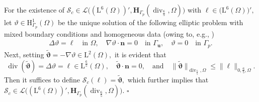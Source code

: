 \documentclass[11pt, reqno, a4paper, twoside]{article}
\newcommand{\bn}{\boldsymbol{n}}
\newcommand{\bu}{\boldsymbol{u}}
\newcommand{\bz}{\boldsymbol{z}}
\newcommand\btau{\boldsymbol{\tau}}
\newcommand{\rH}{\mathrm{H}}
\newcommand{\rL}{\mathrm{L}}
\newcommand{\rW}{\mathrm{W}}
\newcommand{\bH}{\mathbf{H}}
\newcommand{\bL}{\mathbf{L}}
\newcommand{\cL}{\mathcal{L}}
\newcommand{\cS}{\mathcal{S}}
\newcommand\vdiv{\mathop{\mathrm{div}}\nolimits}
\newtheorem{lemma}[theorem]{Lemma}
\newenvironment{proof}{\noindent{\it Proof.}}{\hfill$\square$}
\numberwithin{equation}{section}
\numberwithin{remark}{section}
\numberwithin{figure}{section}
\numberwithin{table}{section}
\newcommand{\rd}[1]{\textcolor{BrickRed}{#1}}
\begin{document}
{\begin{proof}
For the existence of \(\cS_c\in\cL\bigl((\rL^6(\Omega))',\bH_{\Gamma_p}(\vdiv_{\frac65},\Omega)\bigr)\) with \(\ell\in\bigl(\rL^6(\Omega)\bigr)',\) let \(\vartheta \in\rH^{1}_{\Gamma_p}(\Omega)\) be the unique solution of the following elliptic problem with mixed boundary conditions {and homogeneous data} (owing to, e.g., \cite[Chapter~7]{maz_i_a2010elliptic})
\begin{align*}
    \Delta \vartheta=\ell \quad \text{in }\Omega, \quad \nabla \vartheta \cdot \bn = 0\quad \text{in }\Gamma_{\bu}, \quad \vartheta=0 \quad \text{in } \Gamma_p.
\end{align*}
Next, setting \(\tilde{\boldsymbol{\vartheta}} = -\nabla \vartheta\in\rL^{2}(\Omega),\) it is evident that \[\vdiv(\tilde{\boldsymbol{\vartheta}})=\Delta \vartheta=\ell\in\rL^{\frac65}(\Omega), \quad \tilde{\boldsymbol{\vartheta}}\cdot \bn = 0, \quad \text{and}\quad\|\tilde{\boldsymbol{\vartheta}}\|_{\vdiv_{\frac65},\Omega}\leq \|\ell\|_{0,\frac65,\Omega}.\]
Then it suffices to define \(\cS_c(\ell) =\tilde{\boldsymbol{\vartheta}},\) which further implies that \(\cS_c\in\cL\bigl((\rL^6(\Omega))',\bH_{\Gamma_p}(\vdiv_{\frac65},\Omega)\bigr)\). 
\end{proof}
}
\end{document}
